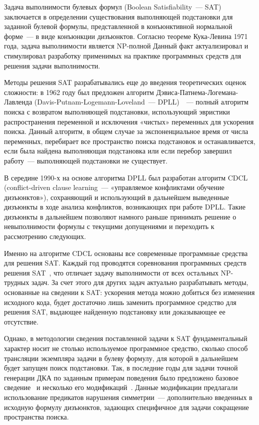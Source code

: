 Задача выполнимости булевых формул (Boolean Satisfiability~--- SAT) заключается в определении существования выполняющей подстановки для заданной булевой формулы, представленной в конъюнктивной нормальной форме~--- в виде конъюнкции дизъюнктов.
Согласно теореме Кука-Левина 1971 года, задача выполнимости является NP-полной
Данный факт актуализировал и стимулировал разработку применимых на практике программных средств для решения задачи выполнимости.

Методы решения SAT разрабатывались еще до введения теоретических оценок сложности: в 1962 году был предложен алгоритм Дэвиса-Патнема-Логемана-Лавленда (Davis-Putnam-Logemann-Loveland~--- DPLL)~\cite{DBLP:journals/cacm/DavisLL62}~--- полный алгоритм поиска с возвратом выполняющей подстановки, использующий эвристики распространения переменной и исключения «чистых» переменных для ускорения поиска.
Данный алгоритм, в общем случае за экспоненциальное время от числа переменных, перебирает все пространство поиска подстановок и останавливается, если была найдена выполняющая подстановка или если перебор завершил работу~--- выполняющей подстановки не существует. 

В середине 1990-х на основе алгоритма DPLL был разработан алгоритм CDCL~\cite{DBLP:conf/iccad/SilvaS96} (conflict-driven clause learning~--- «управляемое конфликтами обучение дизъюнктов»), сохраняющий и использующий в дальнейшем выведенные дизъюнкты в ходе анализа конфликтов, возникающих при работе DPLL.
Такие дизъюнкты в дальнейшем позволяют намного раньше принимать решение о невыполнимости формулы с текущими допущениями и переходить к рассмотрению следующих.

Именно на алгоритме CDCL основаны все современные программные средства для решения SAT.
Каждый год проводятся соревнования программных средств решения SAT~\cite{sat-competitions,sat-competition-2020}, что отличает задачу выполнимости от всех остальных NP-трудных задач.
За счет этого для других задач актуально разрабатывать методы, основанные на сведении к SAT: ускорения метода можно добиться без изменения исходного кода, будет достаточно лишь заменить программное средство для решения SAT, выдающее найденную подстановку или доказывающее ее отсутствие.

Однако, в методологии сведения поставленной задачи к SAT фундаментальный характер носит не столько используемое программное средство, сколько способ трансляции экземпляра задачи в булеву формулу, для которой в дальнейшем будет запущен поиск подстановки.
Так, в последние годы для задачи точной генерации ДКА по заданным примерам поведения было предложено базовое сведение~\cite{heule-icgi10} и несколько его модификаций~\cite{DBLP:journals/ese/HeuleV13,ulyantsev-phd-13}.
Данные модификации предлагали использование предикатов нарушения симметрии~--- дополнительно введенных в исходную формулу дизъюнктов, задающих специфичное для задачи сокращение пространства поиска.


